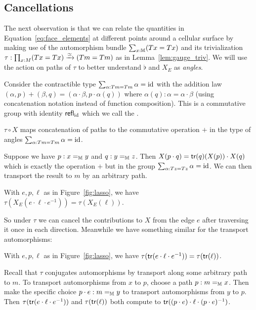 \subsection{Cancellations}
The next observation is that we can relate the quantities in Equation~\ref{eq:face_elements} at different points around a cellular surface by making use of the automorphism bundle \( \sum_{x:\mathbb{M}}(Tx=Tx) \) and its trivialization \( \tau:\prod_{x:M}(Tx=Tx)\xrightarrow[]{\simeq}(Tm=Tm) \) as in Lemma~\ref{lem:gauge_triv}. We will use the action on paths of \( \tau \) to better understand \( \flat \) and \( X_E \) as \emph{angles}.

\begin{mydef}
Consider the contractible type \( \sum_{\alpha:Tm=Tm}\alpha=\text{id} \) with the addition law \( (\alpha, p)+(\beta, q) = (\alpha\cdot\beta, p\cdot \alpha(q)) \) where \( \alpha(q):\alpha=\alpha\cdot\beta \) (using concatenation notation instead of function composition). This is a commutative group with identity \( \mathsf{refl}_{\text{id}} \) which we call the .
\end{mydef}

\begin{mylemma}
\( \tau\circ X \) maps concatenation of paths to the commutative operation \( + \) in the type of angles \( \sum_{\alpha:Tm=Tm}\alpha=\text{id} \).
\end{mylemma}
\begin{myproof}
Suppose we have \( p:x=_{\mathbb{M}} y \) and \( q:y=_{\mathbb{M}} z \). Then \( X(p\cdot q)=\mathsf{tr}(q)(X(p))\cdot X(q) \) which is exactly the operation \( + \) but in the group \( \sum_{\alpha:Tz=Tz}\alpha=\text{id} \). We can then transport the result to \( m \) by an arbitrary path.
\end{myproof}

\begin{mycor}
\label{cor:x_cancel}
With \( e, p, \ell \) as in Figure~\ref{fig:lasso}, we have \(\tau(X_E(e\cdot\ell\cdot e^{-1})) = \tau(X_E(\ell))\).
\end{mycor}

So under \( \tau \) we can cancel the contributions to \( X \) from the edge \( e \) after traversing it once in each direction. Meanwhile we have something similar for the transport automorphisms:

\begin{mylemma}
With \( e, p, \ell \) as in Figure~\ref{fig:lasso}, we have \( \tau(\mathsf{tr}(e\cdot\ell\cdot e^{-1}))=\tau(\mathsf{tr}(\ell)) \).
\end{mylemma}
\begin{myproof}
Recall that \( \tau \) conjugates automorphisms by transport along some arbitrary path to \( m \). To transport automorphisms from \( x \) to \( p \), choose a path \( p:m=_{\mathbb{M}} x \). Then make the specific choice \( p\cdot e:m=_{\mathbb{M}} y \) to transport automorphisms from \( y \) to \( p \). Then \( \tau(\mathsf{tr}(e\cdot\ell\cdot e^{-1})) \) and \( \tau(\mathsf{tr}(\ell)) \) both compute to \( \mathsf{tr}((p\cdot e)\cdot\ell\cdot(p\cdot e)^{-1}) \). 
\end{myproof}

